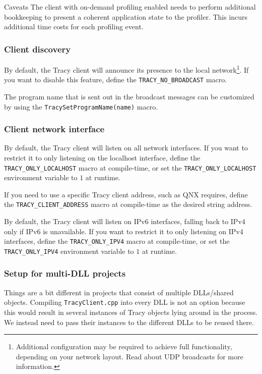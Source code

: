 \documentclass[hidelinks,titlepage,a4paper,twoside]{article}
\begin{document}
\begin{bclogo}[
noborder=true,
couleur=black!5,
logo=\bcattention
]{Caveats}
The client with on-demand profiling enabled needs to perform additional bookkeeping to present a coherent application state to the profiler. This incurs additional time costs for each profiling event.
\end{bclogo}

\subsubsection{Client discovery}

By default, the Tracy client will announce its presence to the local network\footnote{Additional configuration may be required to achieve full functionality, depending on your network layout. Read about UDP broadcasts for more information.}. If you want to disable this feature, define the \texttt{TRACY\_NO\_BROADCAST} macro.

The program name that is sent out in the broadcast messages can be customized by using the \texttt{TracySetProgramName(name)} macro.

\subsubsection{Client network interface}

By default, the Tracy client will listen on all network interfaces. If you want to restrict it to only listening on the localhost interface, define the \texttt{TRACY\_ONLY\_LOCALHOST} macro at compile-time, or set the \texttt{TRACY\_ONLY\_LOCALHOST} environment variable to $1$ at runtime.

If you need to use a specific Tracy client address, such as QNX requires, define the \texttt{TRACY\_CLIENT\_ADDRESS} macro at compile-time as the desired string address.

By default, the Tracy client will listen on IPv6 interfaces, falling back to IPv4 only if IPv6 is unavailable. If you want to restrict it to only listening on IPv4 interfaces, define the \texttt{TRACY\_ONLY\_IPV4} macro at compile-time, or set the \texttt{TRACY\_ONLY\_IPV4} environment variable to $1$ at runtime.

\subsubsection{Setup for multi-DLL projects}

Things are a bit different in projects that consist of multiple DLLs/shared objects. Compiling \texttt{TracyClient.cpp} into every DLL is not an option because this would result in several instances of Tracy objects lying around in the process. We instead need to pass their instances to the different DLLs to be reused there.
\end{document}
